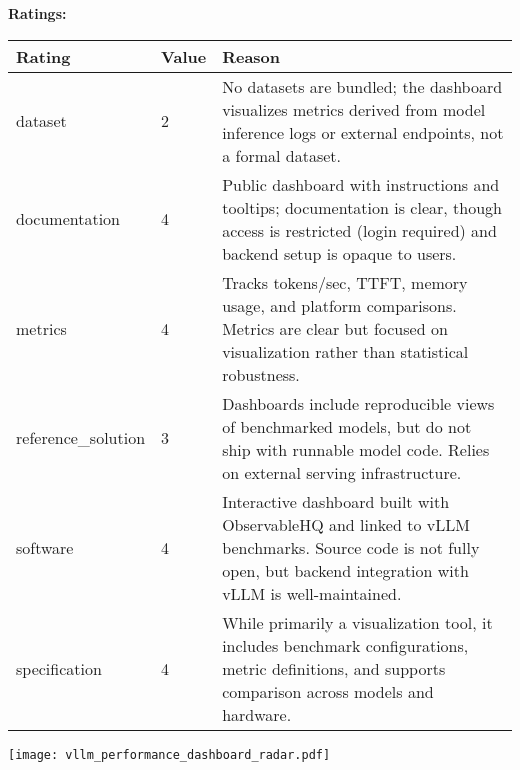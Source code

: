 {{{\bf Ratings:} ~ \\

\begin{tabular}{p{} p{} p{}}
\hline
Rating & Value & Reason \\
\hline
dataset & 2 & No datasets are bundled; the dashboard visualizes metrics derived from model
inference logs or external endpoints, not a formal dataset.
 \\
documentation & 4 & Public dashboard with instructions and tooltips; documentation is clear, though access
is restricted (login required) and backend setup is opaque to users.
 \\
metrics & 4 & Tracks tokens/sec, TTFT, memory usage, and platform comparisons. Metrics are clear
but focused on visualization rather than statistical robustness.
 \\
reference\_solution & 3 & Dashboards include reproducible views of benchmarked models, but do not ship
with runnable model code. Relies on external serving infrastructure.
 \\
software & 4 & Interactive dashboard built with ObservableHQ and linked to vLLM benchmarks.
Source code is not fully open, but backend integration with vLLM is well-maintained.
 \\
specification & 4 & While primarily a visualization tool, it includes benchmark configurations,
metric definitions, and supports comparison across models and hardware.
 \\
\hline
\end{tabular}

\texttt{[image: vllm\_performance\_dashboard\_radar.pdf]}
}}
\clearpage